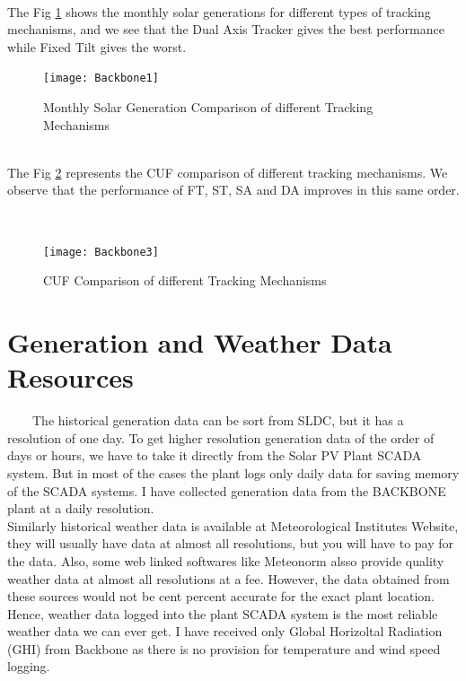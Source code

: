 \\
The Fig \ref{figc2h10} shows the monthly solar generations for different types of tracking mechanisms, and we see that the Dual Axis Tracker gives the best performance while Fixed Tilt gives the worst.
\\
\begin{figure}[H]
\centering
\texttt{[image: Backbone1]}
\caption{Monthly Solar Generation Comparison of different Tracking Mechanisms}
\label{figc2h10} %
\end{figure}
\\
The Fig \ref{figc2h11} represents the CUF comparison of different tracking mechanisms. We observe that the performance of FT, ST, SA and DA improves in this same order.

\\

\begin{figure}[H]
\centering
\texttt{[image: Backbone3]}
\caption{CUF Comparison of different Tracking Mechanisms}
\label{figc2h11} %
\end{figure}

\newpage

\section{Generation and Weather Data Resources}
\
\
\
\
The historical generation data can be sort from SLDC, but it has a resolution of one day. To get higher resolution generation data of the order of days or hours, we have to take it directly from the Solar PV Plant SCADA system. But in most of the cases the plant logs only daily data for saving memory of the SCADA systems. I have collected generation data from the BACKBONE plant at a daily resolution.\\

Similarly historical weather data is available at Meteorological Institutes Website, they will usually have data at almost all resolutions, but you will have to pay for the data. Also, some web linked softwares like Meteonorm alsso provide quality weather data at almost all resolutions at a fee. However, the data obtained from these sources would not be cent percent accurate for the exact plant location. Hence, weather data logged into the plant SCADA system is the most reliable weather data we can ever get. I have received only Global Horizoltal Radiation (GHI) from Backbone as there is no provision for temperature and wind speed logging.



